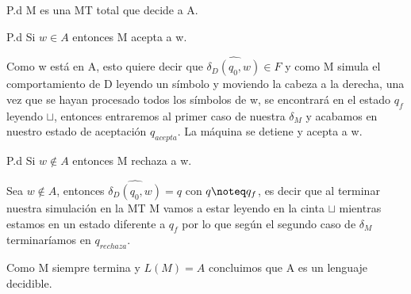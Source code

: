 \documentclass{article}
\begin{document}
\begin{enumerate}
  P.d M es una MT total que decide a A.

  P.d Si $w \in A$ entonces M acepta a w.

  Como w está en A, esto quiere decir que $\widehat{\delta_D(q_0,w)} \in F$ y como M simula el comportamiento de D leyendo un símbolo y moviendo la cabeza a la derecha, una vez que se hayan procesado todos los símbolos de w, se encontrará en el estado $q_f$ leyendo $\sqcup$, entonces entraremos al primer caso de nuestra $\delta_M$ y acabamos en nuestro estado de aceptación $q_{acepta}$. La máquina se detiene y acepta a w.
 
  P.d Si $w \notin A$ entonces M rechaza a w.
  
  Sea $w \notin A$, entonces $\widehat{\delta_D(q_0,w)}= q$ con $q \noteq q_f$, es decir que al terminar nuestra simulación en la MT M vamos a estar leyendo en la cinta $\sqcup$ mientras estamos en un estado diferente a $q_f$ por lo que según el segundo caso de $\delta_M$ terminaríamos en $q_{rechaza}$.

  Como M siempre termina y $L(M) =A$ concluimos que A es un lenguaje decidible.
  

  
  \end{enumerate}
\end{document}
